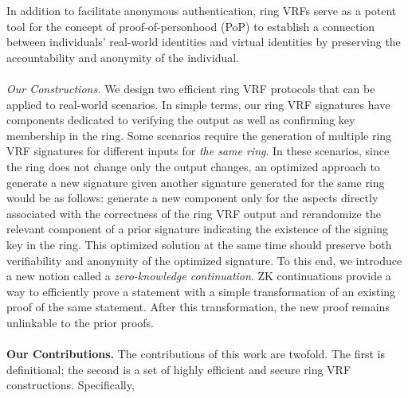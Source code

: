 In addition to facilitate anonymous authentication, ring VRFs  serve as a potent tool for the concept of proof-of-personhood (PoP) \cite{pop2008,pop2017,pop2020} to establish a connection between individuals' real-world identities and virtual identities by preserving the accountability and anonymity of the individual.
\\\\
\emph{Our Constructions.}
 We design two efficient ring VRF protocols that can be applied to real-world scenarios.
In simple terms,  our ring VRF signatures have components dedicated to verifying the output as well as confirming key membership in the ring. Some scenarios require the generation of multiple ring VRF signatures for different inputs for \emph{the same ring}. In these scenarios,  since the ring does not change only the output changes, an optimized approach to generate a new signature given another signature generated for the same ring would be as follows:  generate a new component only for the aspects directly associated with the correctness of the ring VRF output and  rerandomize the relevant component of a prior signature indicating the existence of the signing key in the ring. This optimized solution at the same time should preserve both verifiability and anonymity of the optimized signature.
To this end, we introduce a  new notion called  a \emph{zero-knowledge continuation}. ZK continuations provide a way to efficiently prove a statement with a simple transformation of an existing proof of the same statement. After this transformation, the new proof remains unlinkable to the prior proofs. 
\\\\
\noindent \textbf{Our Contributions.} The contributions of this work are twofold.  The first is definitional; the second is a set of highly efficient and secure ring VRF constructions.  Specifically,

